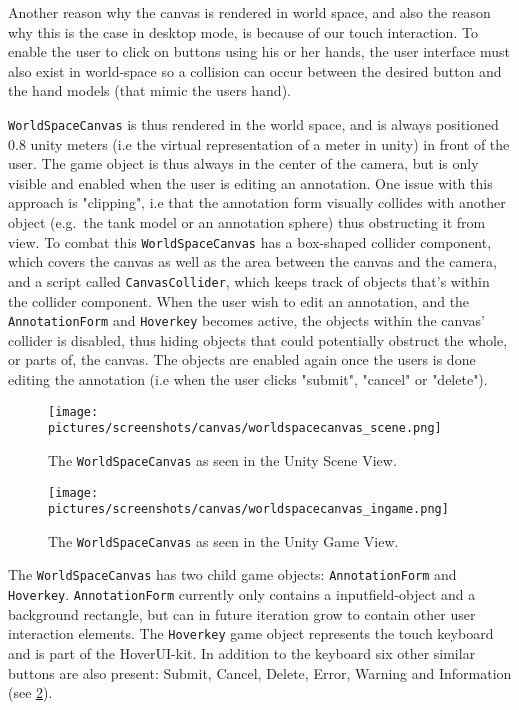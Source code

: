 Another reason why the canvas is rendered in world space, and also the reason why this is the case in desktop mode, is because of our touch interaction.
To enable the user to click on buttons using his or her hands, the user interface must also exist in world-space so a collision can occur between the desired 
button and the hand models (that mimic the users hand). 

\texttt{WorldSpaceCanvas} is thus rendered in the world space, and is always positioned 0.8 unity meters (i.e the virtual representation of a meter in unity) 
in front of the user. The game object is thus always in the center of the camera, but is only visible and enabled when the user is editing an annotation. 
One issue with this approach is "clipping", i.e that the annotation form visually collides with another object (e.g.~the tank model or an annotation sphere) thus
obstructing it from view. To combat this \texttt{WorldSpaceCanvas} has a box-shaped collider component, which covers the canvas as well as the area between the canvas and the camera, 
and a script called \texttt{CanvasCollider}, which keeps track of objects that's within the collider component. When the user wish to edit an annotation, and the 
\texttt{AnnotationForm} and \texttt{Hoverkey} becomes active, the objects within the canvas' collider is disabled, thus hiding objects that could potentially
obstruct the whole, or parts of, the canvas. The objects are enabled again once the users is done editing the annotation (i.e when the user clicks "submit", "cancel" or "delete").

\begin{figure}%
	\texttt{[image: pictures/screenshots/canvas/worldspacecanvas\_scene.png]}
	\caption[The \texttt{WorldSpaceCanvas} as seen in the Unity Scene View]{The \texttt{WorldSpaceCanvas} as seen in the Unity Scene View.}
	\label{fig:worldspacecanvas_scene}
\end{figure} 

\begin{figure}%
	\texttt{[image: pictures/screenshots/canvas/worldspacecanvas\_ingame.png]}
	\caption[The \texttt{WorldSpaceCanvas} as seen in the Unity Game View]{The \texttt{WorldSpaceCanvas} as seen in the Unity Game View.}
	\label{fig:worldspacecanvas_ingame}
\end{figure} 

The \texttt{WorldSpaceCanvas} has two child game objects: \texttt{AnnotationForm} and \texttt{Hoverkey}. 
\texttt{AnnotationForm} currently only contains a inputfield-object and a background rectangle, but can in future iteration grow to 
contain other user interaction elements. The \texttt{Hoverkey} game object represents the touch keyboard and is part of the HoverUI-kit.
In addition to the keyboard six other similar buttons are also present: Submit, Cancel, Delete, Error, Warning and Information (see \ref{fig:worldspacecanvas_ingame}).

